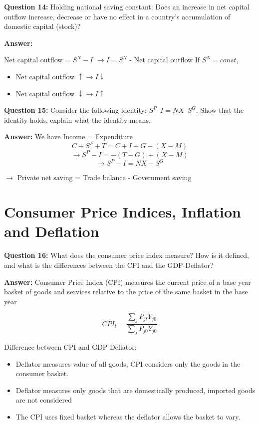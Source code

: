 \documentclass[a4paper, 11pt]{article}
\begin{document}
\textbf{Question 14:} Holding national saving constant: Does an increase in net capital outflow increase, decrease or have no effect in a country's accumulation of domestic capital (stock)?

\textbf{Answer:}  

Net capital outflow = $S^{N} - I$
$\rightarrow I =  S^{N}$ - Net capital outflow
If $S^{N} = const$, 
\begin{itemize}
\item Net capital outflow $\uparrow \rightarrow I \downarrow$
\item Net capital outflow $\downarrow \rightarrow I \uparrow$
\end{itemize}

\textbf{Question 15:} Consider the following identity: $S^{P} – I = NX – S^{G}$. Show that the identity holds, explain what the identity means.

\textbf{Answer:}  
We have Income = Expenditure
$$C + S^{P} + T = C + I + G + (X - M)$$
$$\rightarrow S^{P} - I = -(T - G) + (X - M)$$
$$\rightarrow S^{P} - I = NX - S^{G}$$

$\rightarrow$ Private net saving = Trade balance - Government saving

\section{Consumer Price Indices, Inflation and Deflation}

\textbf{Question 16:} What does the consumer price index measure? How is it defined, and what is the differences between the CPI and the GDP-Deflator?

\textbf{Answer:} 
Consumer Price Index (CPI) measures the current price of a base year basket of goods and services relative to the price of the same basket in the base year

$$CPI_{t} = \frac{\sum_{j}P_{jt}Y_{j0}}{\sum_{j}P_{j0}Y_{j0}}$$

Difference between CPI and GDP Deflator:
\begin{itemize}
\item Deflator measures value of all goods, CPI considers only the goods in the consumer basket.
\item Deflator measures only goods that are domestically produced, imported goods are not considered
\item The CPI uses fixed basket whereas the deflator allows the basket to vary.
\end{itemize}
\end{document}
